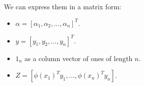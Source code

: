 We can express them in a matrix form:
\begin{itemize}
	\item $\alpha = [\alpha_1, \alpha_2, \ldots, \alpha_n]^T$.
	\item $y = [y_1, y_2, \ldots, y_n]^T$.
	\item $1_n$ as a column vector of ones of length $n$.
	\item $Z = [\phi(x_1)^Ty_1, \dots, \phi(x_n)^Ty_n]$.
\end{itemize}




